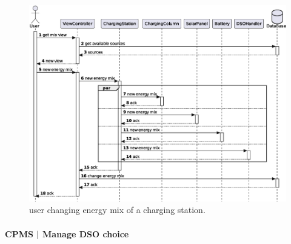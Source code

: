 \begin{figure}[h!]
    \centering
    \includegraphics[width=1\columnwidth]{./images/diagrams/sequences/cpms/energyMix}
    \caption{user changing energy mix of a charging station.}
\end{figure}

\pagebreak

\paragraph{CPMS | Manage DSO choice}

